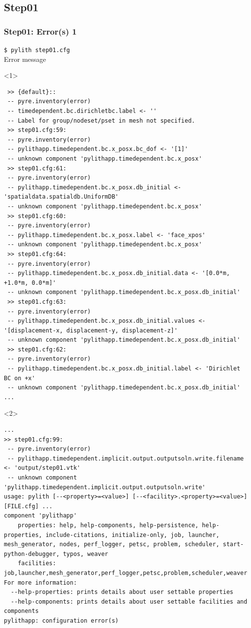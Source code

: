 \documentclass[aspectration=169]{beamer}
\newcommand{\cmd}[1]{{\footnotesize\tt \color{ltred}#1}}
\newcommand{\errlabel}[1]{{\small \color{blue}#1}}
\begin{document}
\subsection{Step01}

\begin{frame}[fragile]
  \frametitle{Step01: Error(s) 1}

\cmd{\$ pylith step01.cfg}\\
\errlabel{Error message}
\begin{onlyenv}<1>
\begin{lstlisting}
 >> {default}::
 -- pyre.inventory(error)
 -- timedependent.bc.dirichletbc.label <- ''
 -- Label for group/nodeset/pset in mesh not specified.
 >> step01.cfg:59:
 -- pyre.inventory(error)
 -- pylithapp.timedependent.bc.x_posx.bc_dof <- '[1]'
 -- unknown component 'pylithapp.timedependent.bc.x_posx'
 >> step01.cfg:61:
 -- pyre.inventory(error)
 -- pylithapp.timedependent.bc.x_posx.db_initial <- 'spatialdata.spatialdb.UniformDB'
 -- unknown component 'pylithapp.timedependent.bc.x_posx'
 >> step01.cfg:60:
 -- pyre.inventory(error)
 -- pylithapp.timedependent.bc.x_posx.label <- 'face_xpos'
 -- unknown component 'pylithapp.timedependent.bc.x_posx'
 >> step01.cfg:64:
 -- pyre.inventory(error)
 -- pylithapp.timedependent.bc.x_posx.db_initial.data <- '[0.0*m, +1.0*m, 0.0*m]'
 -- unknown component 'pylithapp.timedependent.bc.x_posx.db_initial'
 >> step01.cfg:63:
 -- pyre.inventory(error)
 -- pylithapp.timedependent.bc.x_posx.db_initial.values <- '[displacement-x, displacement-y, displacement-z]'
 -- unknown component 'pylithapp.timedependent.bc.x_posx.db_initial'
 >> step01.cfg:62:
 -- pyre.inventory(error)
 -- pylithapp.timedependent.bc.x_posx.db_initial.label <- 'Dirichlet BC on +x'
 -- unknown component 'pylithapp.timedependent.bc.x_posx.db_initial'
...
\end{lstlisting}
\end{onlyenv}
\begin{onlyenv}<2>
\begin{lstlisting}
...
>> step01.cfg:99:
 -- pyre.inventory(error)
 -- pylithapp.timedependent.implicit.output.outputsoln.write.filename <- 'output/step01.vtk'
 -- unknown component 'pylithapp.timedependent.implicit.output.outputsoln.write'
usage: pylith [--<property>=<value>] [--<facility>.<property>=<value>] [FILE.cfg] ...
component 'pylithapp'
    properties: help, help-components, help-persistence, help-properties, include-citations, initialize-only, job, launcher, mesh_generator, nodes, perf_logger, petsc, problem, scheduler, start-python-debugger, typos, weaver
    facilities: job,launcher,mesh_generator,perf_logger,petsc,problem,scheduler,weaver
For more information:
  --help-properties: prints details about user settable properties
  --help-components: prints details about user settable facilities and components
pylithapp: configuration error(s)
\end{lstlisting}
\end{onlyenv}

  
\end{frame}
\end{document}
